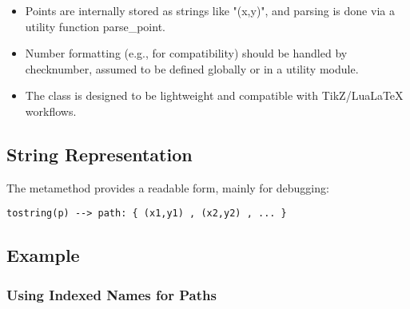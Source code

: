 \begin{itemize}
\item Points are internally stored as strings like "(x,y)", and parsing is done via a utility function parse\_point.


\item Number formatting (e.g., for \TIKZ{} compatibility) should be handled by checknumber, assumed to be defined globally or in a utility module.

\item The class is designed to be lightweight and compatible with TikZ/LuaLaTeX workflows.

\end{itemize}

\subsection{String Representation}

The  metamethod provides a readable form, mainly for debugging:

\begin{verbatim}
tostring(p) --> path: { (x1,y1) , (x2,y2) , ... }
\end{verbatim}


\subsection{Example}

\begin{tkzexample}[latex=.45\textwidth]
\end{tkzexample}


\subsubsection*{Using Indexed Names for Paths}

